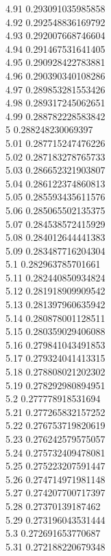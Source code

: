 {4.91	0.293091035985858\\
4.92	0.292548836169792\\
4.93	0.292007668746604\\
4.94	0.291467531641405\\
4.95	0.290928422783881\\
4.96	0.290390340108286\\
4.97	0.289853281553426\\
4.98	0.289317245062651\\
4.99	0.288782228583842\\
5	0.288248230069397\\
5.01	0.287715247476226\\
5.02	0.287183278765733\\
5.03	0.286652321903807\\
5.04	0.286122374860813\\
5.05	0.285593435611576\\
5.06	0.285065502135375\\
5.07	0.284538572415929\\
5.08	0.284012644441383\\
5.09	0.283487716204304\\
5.1	0.282963785701661\\
5.11	0.282440850934824\\
5.12	0.281918909909542\\
5.13	0.281397960635942\\
5.14	0.280878001128511\\
5.15	0.280359029406088\\
5.16	0.279841043491853\\
5.17	0.279324041413315\\
5.18	0.278808021202302\\
5.19	0.278292980894951\\
5.2	0.277778918531694\\
5.21	0.277265832157252\\
5.22	0.276753719820619\\
5.23	0.276242579575057\\
5.24	0.275732409478081\\
5.25	0.275223207591447\\
5.26	0.274714971981148\\
5.27	0.274207700717397\\
5.28	0.27370139187462\\
5.29	0.273196043531444\\
5.3	0.272691653770687\\
5.31	0.272188220679348\\
}
